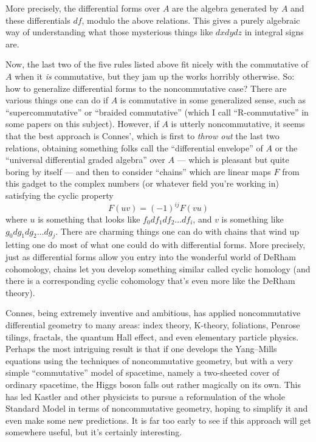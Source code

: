 \documentclass{article}
\begin{document}
More precisely, the differential forms over \(A\) are the algebra
generated by \(A\) and these differentials \(df\), modulo the above
relations. This gives a purely algebraic way of understanding what those
mysterious things like \(dx dy dz\) in integral signs are.

Now, the last two of the five rules listed above fit nicely with the
commutative of \(A\) when it \emph{is} commutative, but they jam up the
works horribly otherwise. So: how to generalize differential forms to
the noncommutative case? There are various things one can do if \(A\) is
commutative in some generalized sense, such as ``supercommutative'' or
``braided commutative'' (which I call ``R-commutative'' in some papers
on this subject). However, if \(A\) is utterly noncommutative, it seems
that the best approach is Connes', which is first to \emph{throw out}
the last two relations, obtaining something folks call the
``differential envelope'' of \(A\) or the ``universal differential
graded algebra'' over \(A\) --- which is pleasant but quite boring by
itself --- and then to consider ``chains'' which are linear maps \(F\)
from this gadget to the complex numbers (or whatever field you're
working in) satisfying the cyclic property \[F(uv) = (-1)^{ij} F(vu)\]
where \(u\) is something that looks like \(f_0 df_1 df_2 \ldots df_i\),
and \(v\) is something like \(g_0 dg_1 dg_2 \ldots dg_j\). There are
charming things one can do with chains that wind up letting one do most
of what one could do with differential forms. More precisely, just as
differential forms allow you entry into the wonderful world of DeRham
cohomology, chains let you develop something similar called cyclic
homology (and there is a corresponding cyclic cohomology that's even
more like the DeRham theory).

Connes, being extremely inventive and ambitious, has applied
noncommutative differential geometry to many areas: index theory,
K-theory, foliations, Penrose tilings, fractals, the quantum Hall
effect, and even elementary particle physics. Perhaps the most
intriguing result is that if one develops the Yang--Mills equations using
the techniques of noncommutative geometry, but with a very simple
``commutative'' model of spacetime, namely a two-sheeted cover of
ordinary spacetime, the Higgs boson falls out rather magically on its
own. This has led Kastler and other physicists to pursue a reformulation
of the whole Standard Model in terms of noncommutative geometry, hoping
to simplify it and even make some new predictions. It is far too early
to see if this approach will get somewhere useful, but it's certainly
interesting.
\end{document}
